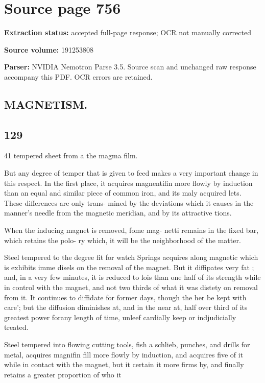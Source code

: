 \clearpage
\section{Source page 756}
\textbf{Extraction status:} accepted full-page response; OCR not manually corrected\par
\textbf{Source volume:} 191253808\par
\textbf{Parser:} NVIDIA Nemotron Parse 3.5. Source scan and unchanged raw response accompany this PDF. OCR errors are retained.\par\medskip
\subsection*{MAGNETISM.}
\subsection*{129}
41 tempered
sheet
from a
the magma
film.\par\medskip
But any degree of temper that is given to feed makes
a very important change in this respect. In the first
place, it acquires magnentifin more flowly by induction
than an equal and similar piece of common iron, and its
maly acquired lets. These differences are only trans-
mined by the deviations which it causes in the manner’s
needle from the magnetic meridian, and by its attractive
tions.\par\medskip
When the inducing magnet is removed, fome mag-
netti remains in the fixed bar, which retains the polo-
ry which, it will be the neighborhood of the matter.\par\medskip
Steel tempered to the degree fit for watch Springs
acquires along magnetic which is exhibits imme
disels on the removal of the magnet. But it diffipates
very fat ; and, in a very few minutes, it is reduced to
lois than one half of its strength while in control with
the magnet, and not two thirds of what it was
distety on removal from it. It continues to diffidate for
former days, though the her be kept with care'; but the
diffusion diminishes at, and in the near at, half over
third of its greatest power forany length of time, unleef
cardially keep or indjudicially treated.\par\medskip
Steel tempered into flowing cutting tools, fish a schlieb,
punches, and drills for metal, acquires magnifin fill
more flowly by induction, and acquires five of it while
in contact with the magnet, but it certain it more firms
by, and finally retains a greater proportion of who it
